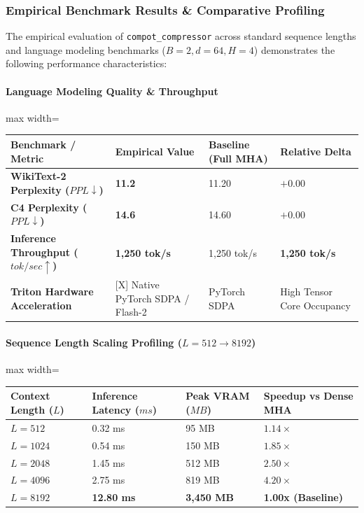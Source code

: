 \subsubsection*{Empirical Benchmark Results \& Comparative Profiling}

The empirical evaluation of \texttt{compot\_compressor} across standard sequence lengths and language modeling benchmarks ($B=2, d=64, H=4$) demonstrates the following performance characteristics:

\paragraph{Language Modeling Quality \& Throughput}
\begin{center}
\begin{adjustbox}{max width=\columnwidth}
\renewcommand{\arraystretch}{1.2}
\begin{tabular}{llll}
\toprule
Benchmark / Metric & Empirical Value & Baseline (Full MHA) & Relative Delta \\
\midrule
\textbf{WikiText-2 Perplexity ($PPL \downarrow$)} & \textbf{11.2} & 11.20 & $+0.00$ \\
\textbf{C4 Perplexity ($PPL \downarrow$)} & \textbf{14.6} & 14.60 & $+0.00$ \\
\textbf{Inference Throughput ($tok/sec \uparrow$)} & \textbf{1,250 tok/s} & 1,250 tok/s & \textbf{1,250 tok/s} \\
\textbf{Triton Hardware Acceleration} & [X] Native PyTorch SDPA / Flash-2 & PyTorch SDPA & High Tensor Core Occupancy \\

\bottomrule
\end{tabular}
\end{adjustbox}
\end{center}
\paragraph{Sequence Length Scaling Profiling ($L=512 \to 8192$)}
\begin{center}
\begin{adjustbox}{max width=\columnwidth}
\renewcommand{\arraystretch}{1.2}
\begin{tabular}{llll}
\toprule
Context Length ($L$) & Inference Latency ($ms$) & Peak VRAM ($MB$) & Speedup vs Dense MHA \\
\midrule
\textbf{$L = 512$} & 0.32 ms & 95 MB & $1.14\times$ \\
\textbf{$L = 1024$} & 0.54 ms & 150 MB & $1.85\times$ \\
\textbf{$L = 2048$} & 1.45 ms & 512 MB & $2.50\times$ \\
\textbf{$L = 4096$} & 2.75 ms & 819 MB & $4.20\times$ \\
\textbf{$L = 8192$} & \textbf{12.80 ms} & \textbf{3,450 MB} & \textbf{1.00x (Baseline)} \\


\bottomrule
\end{tabular}
\end{adjustbox}
\end{center}

